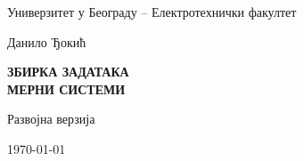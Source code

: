 \begin{center}
\Large

\vfill

Универзитет у Београду -- Електротехнички факултет

\vfill

Данило Ђокић \\

\vfill


\textbf{
    ЗБИРКА ЗАДАТАКА \\
    \Huge МЕРНИ СИСТЕМИ \\
} 

\vfill

Развојна верзија\\

\vfill

\today 

\end{center}
